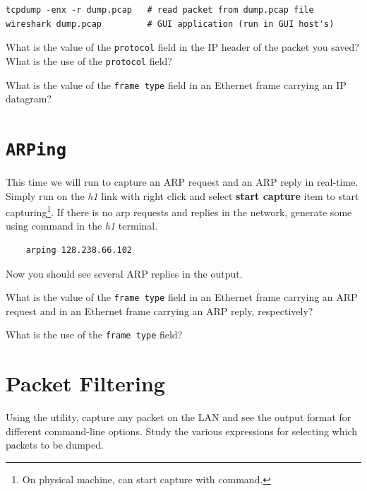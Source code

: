 \documentclass{../UTNetLab}
\begin{document}
\begin{lstlisting}[emph={dump,pcap}]
tcpdump -enx -r dump.pcap   # read packet from dump.pcap file
wireshark dump.pcap         # GUI application (run in GUI host's)
\end{lstlisting}

\begin{report}
    \item What is the value of the \texttt{protocol} field in the IP header of the packet you saved?
    What is the use of the \texttt{protocol} field?

    \item What is the value of the \texttt{frame type} field in an Ethernet frame carrying an IP datagram?
\end{report}

\section{\texttt{ARPing}}
This time we will run  to capture an ARP request and an ARP reply in real-time.
Simply run  on the \textit{h1} link with right click and select \textbf{start capture} item to start capturing\footnote{On physical machine, can start capture with  command.}.
If there is no arp requests and replies in the network, generate some using  command in the \textit{h1} terminal.

\begin{lstlisting}
	arping 128.238.66.102
\end{lstlisting}

Now you should see several ARP replies in the  output.

\begin{report}
    \item What is the value of the \texttt{frame type} field in an Ethernet frame carrying an ARP request and in an Ethernet frame carrying an ARP reply, respectively?

    \item What is the use of the \texttt{frame type} field?
\end{report}

\section{Packet Filtering}
Using the  utility, capture any packet on the LAN and see the output format
for different command-line options.
Study the various expressions for selecting
which packets to be dumped.
\end{document}
